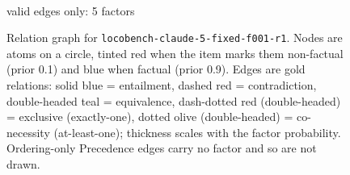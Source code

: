 \documentclass[11pt]{article}
\begin{document}
\begin{figure}[htbp]
\begin{minipage}[t]{0.48\linewidth}
{
}
\\[2pt]{\footnotesize valid edges only: 5 factors}
\end{minipage}
\caption{Relation graph for \texttt{locobench-claude-5-fixed-f001-r1}. Nodes are atoms on a circle, tinted red when the item marks them non-factual (prior 0.1) and blue when factual (prior 0.9). Edges are gold relations: solid blue = entailment, dashed red = contradiction, double-headed teal = equivalence, dash-dotted red (double-headed) = exclusive (exactly-one), dotted olive (double-headed) = co-necessity (at-least-one); thickness scales with the factor probability. Ordering-only Precedence edges carry no factor and so are not drawn.}
\label{fig:graph-locobench-claude-5-fixed-f001-r1}
\end{figure}
\end{document}
